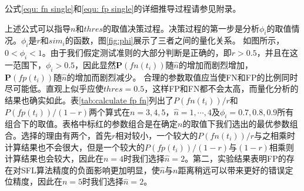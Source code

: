 公式\ref{equ: fn single}和\ref{equ: fp single}的详细推导过程请参见附录。

上述公式可以指导$n$和$thres$的取值决策过程。决策过程的第一步是分析$\phi_i$的取值情况。$\phi_i$是$r$和$sim_i$的函数，图\ref{fig:phi}展示了三者之间的量化关系。
如图所示，$0 < \phi_i < 1$。由于我们假定测试准则的大部分判断是正确的，即$r > 0.5$，并且在这一范围下，$\phi_i > 0.5$，因此显然$\mathbf{P}(fn(t_i))$随$\hat{n}$的增加而剧烈增加，$\mathbf{P}(fp(t_i))$随$\hat{n}$的增加而剧烈减少。
合理的参数取值应当使FN和FP的比例同时尽可能低。直观上似乎应使$thres = 0.5$，这样FP和FN都不会太高，而量化分析的结果也确实如此。表\ref{tab:calculate fp fn}列出了$P(fn(t_i))/r$和$P(fp(t_i))/(1 - r)$两个算式在$n = 3, 4, 5$，$\hat{n} = 1,\cdots, 4$及$\phi_i = 0.7, 0.8, 0.9$所有组合下的取值。表格中标红的参数组合是在确定$n$的取值下我们选出的最优参数组合。选择的理由有两个，首先$r$相对较小，一个较大的$P(fn(t_i))/r$与之相乘时计算结果也不会很大，但是一个较大的$P(fp(t_i))/(1 - r)$与$(1-r)$相乘则计算结果也会较大，因此在$n = 4$时我们选择$\hat{n} = 2$。第二，实验结果表明FP的存在对SFL算法精度的负面影响更加明显，使$\hat{n}$与$n$距离稍远可以带来更好的错误定位精度，因此在$n = 5$时我们选择$\hat{n} = 2$。
